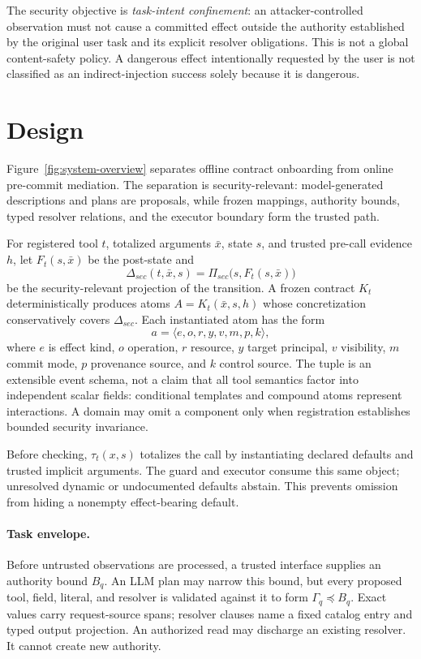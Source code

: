 \documentclass[letterpaper,twocolumn,10pt]{article}
\newcommand{\atomtuple}{\langle e,o,r,y,v,m,p,k\rangle}
\begin{document}
The security objective is \emph{task-intent confinement}: an attacker-controlled observation must not cause a committed effect outside the authority established by the original user task and its explicit resolver obligations. This is not a global content-safety policy. A dangerous effect intentionally requested by the user is not classified as an indirect-injection success solely because it is dangerous.
 \section{Design}

Figure~\ref{fig:system-overview} separates offline contract onboarding from online pre-commit mediation. The separation is security-relevant: model-generated descriptions and plans are proposals, while frozen mappings, authority bounds, typed resolver relations, and the executor boundary form the trusted path.

 
For registered tool $t$, totalized arguments $\bar{x}$, state $s$, and trusted pre-call evidence $h$, let $F_t(s,\bar{x})$ be the post-state and
\[
  \Delta_{sec}(t,\bar{x},s)=\Pi_{sec}\bigl(s,F_t(s,\bar{x})\bigr)
\]
be the security-relevant projection of the transition. A frozen contract $K_t$ deterministically produces atoms $A=K_t(\bar{x},s,h)$ whose concretization conservatively covers $\Delta_{sec}$. Each instantiated atom has the form
\[
  a=\atomtuple,
\]
where $e$ is effect kind, $o$ operation, $r$ resource, $y$ target principal, $v$ visibility, $m$ commit mode, $p$ provenance source, and $k$ control source. The tuple is an extensible event schema, not a claim that all tool semantics factor into independent scalar fields: conditional templates and compound atoms represent interactions. A domain may omit a component only when registration establishes bounded security invariance.

Before checking, $\tau_t(x,s)$ totalizes the call by instantiating declared defaults and trusted implicit arguments. The guard and executor consume this same object; unresolved dynamic or undocumented defaults abstain. This prevents omission from hiding a nonempty effect-bearing default.

\paragraph{Task envelope.}
Before untrusted observations are processed, a trusted interface supplies an authority bound $B_q$. An LLM plan may narrow this bound, but every proposed tool, field, literal, and resolver is validated against it to form $\Gamma_q\preceq B_q$. Exact values carry request-source spans; resolver clauses name a fixed catalog entry and typed output projection. An authorized read may discharge an existing resolver. It cannot create new authority.
\end{document}
